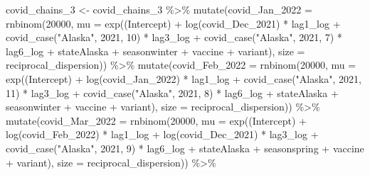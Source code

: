 \documentclass[
]{book}
\newenvironment{Shaded}{\begin{snugshade}}{\end{snugshade}}
\newcommand{\AttributeTok}[1]{\textcolor[rgb]{0.77,0.63,0.00}{#1}}
\newcommand{\DecValTok}[1]{\textcolor[rgb]{0.00,0.00,0.81}{#1}}
\newcommand{\FunctionTok}[1]{\textcolor[rgb]{0.00,0.00,0.00}{#1}}
\newcommand{\NormalTok}[1]{#1}
\newcommand{\OtherTok}[1]{\textcolor[rgb]{0.56,0.35,0.01}{#1}}
\newcommand{\SpecialCharTok}[1]{\textcolor[rgb]{0.00,0.00,0.00}{#1}}
\newcommand{\StringTok}[1]{\textcolor[rgb]{0.31,0.60,0.02}{#1}}
\begin{document}
\begin{Shaded}
\begin{Highlighting}[]
\NormalTok{covid\_chains\_3 }\OtherTok{\textless{}{-}}\NormalTok{ covid\_chains\_3 }\SpecialCharTok{\%\textgreater{}\%}
  \FunctionTok{mutate}\NormalTok{(}\AttributeTok{covid\_Jan\_2022 =} \FunctionTok{rnbinom}\NormalTok{(}\DecValTok{20000}\NormalTok{, }\AttributeTok{mu =} \FunctionTok{exp}\NormalTok{(}\StringTok{\textasciigrave{}}\AttributeTok{(Intercept)}\StringTok{\textasciigrave{}} \SpecialCharTok{+} \FunctionTok{log}\NormalTok{(covid\_Dec\_2021) }\SpecialCharTok{*}\NormalTok{ lag1\_log }\SpecialCharTok{+} \FunctionTok{covid\_case}\NormalTok{(}\StringTok{"Alaska"}\NormalTok{, }\DecValTok{2021}\NormalTok{, }\DecValTok{10}\NormalTok{) }\SpecialCharTok{*}\NormalTok{ lag3\_log }\SpecialCharTok{+} \FunctionTok{covid\_case}\NormalTok{(}\StringTok{"Alaska"}\NormalTok{, }\DecValTok{2021}\NormalTok{, }\DecValTok{7}\NormalTok{) }\SpecialCharTok{*}\NormalTok{ lag6\_log }\SpecialCharTok{+}\NormalTok{ stateAlaska }\SpecialCharTok{+}\NormalTok{ seasonwinter }\SpecialCharTok{+}\NormalTok{ vaccine }\SpecialCharTok{+}\NormalTok{ variant), }\AttributeTok{size =}\NormalTok{ reciprocal\_dispersion)) }\SpecialCharTok{\%\textgreater{}\%}
  \FunctionTok{mutate}\NormalTok{(}\AttributeTok{covid\_Feb\_2022 =} \FunctionTok{rnbinom}\NormalTok{(}\DecValTok{20000}\NormalTok{, }\AttributeTok{mu =} \FunctionTok{exp}\NormalTok{(}\StringTok{\textasciigrave{}}\AttributeTok{(Intercept)}\StringTok{\textasciigrave{}} \SpecialCharTok{+} \FunctionTok{log}\NormalTok{(covid\_Jan\_2022) }\SpecialCharTok{*}\NormalTok{ lag1\_log }\SpecialCharTok{+} \FunctionTok{covid\_case}\NormalTok{(}\StringTok{"Alaska"}\NormalTok{, }\DecValTok{2021}\NormalTok{, }\DecValTok{11}\NormalTok{) }\SpecialCharTok{*}\NormalTok{ lag3\_log }\SpecialCharTok{+} \FunctionTok{covid\_case}\NormalTok{(}\StringTok{"Alaska"}\NormalTok{, }\DecValTok{2021}\NormalTok{, }\DecValTok{8}\NormalTok{) }\SpecialCharTok{*}\NormalTok{ lag6\_log }\SpecialCharTok{+}\NormalTok{ stateAlaska }\SpecialCharTok{+}\NormalTok{ seasonwinter }\SpecialCharTok{+}\NormalTok{ vaccine }\SpecialCharTok{+}\NormalTok{ variant), }\AttributeTok{size =}\NormalTok{ reciprocal\_dispersion)) }\SpecialCharTok{\%\textgreater{}\%}
  \FunctionTok{mutate}\NormalTok{(}\AttributeTok{covid\_Mar\_2022 =} \FunctionTok{rnbinom}\NormalTok{(}\DecValTok{20000}\NormalTok{, }\AttributeTok{mu =} \FunctionTok{exp}\NormalTok{(}\StringTok{\textasciigrave{}}\AttributeTok{(Intercept)}\StringTok{\textasciigrave{}} \SpecialCharTok{+} \FunctionTok{log}\NormalTok{(covid\_Feb\_2022) }\SpecialCharTok{*}\NormalTok{ lag1\_log }\SpecialCharTok{+} \FunctionTok{log}\NormalTok{(covid\_Dec\_2021) }\SpecialCharTok{*}\NormalTok{ lag3\_log }\SpecialCharTok{+} \FunctionTok{covid\_case}\NormalTok{(}\StringTok{"Alaska"}\NormalTok{, }\DecValTok{2021}\NormalTok{, }\DecValTok{9}\NormalTok{) }\SpecialCharTok{*}\NormalTok{ lag6\_log }\SpecialCharTok{+}\NormalTok{ stateAlaska }\SpecialCharTok{+}\NormalTok{ seasonspring }\SpecialCharTok{+}\NormalTok{ vaccine }\SpecialCharTok{+}\NormalTok{ variant), }\AttributeTok{size =}\NormalTok{ reciprocal\_dispersion)) }\SpecialCharTok{\%\textgreater{}\%}

\end{Highlighting}
\end{Shaded}
\end{document}
